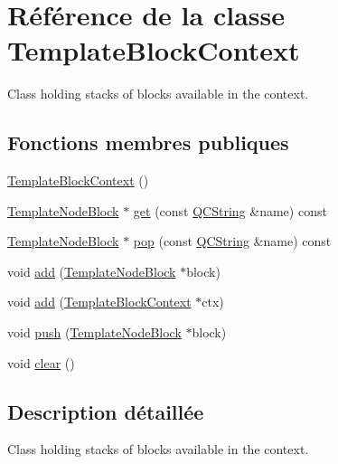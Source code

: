 \hypertarget{class_template_block_context}{}\section{Référence de la classe Template\+Block\+Context}
\label{class_template_block_context}


Class holding stacks of blocks available in the context.  


\subsection*{Fonctions membres publiques}
\begin{DoxyCompactItemize}
\item 
\hyperlink{class_template_block_context_a98a4ea674bc9af4bae99d619c01bd26d}{Template\+Block\+Context} ()
\item 
\hyperlink{class_template_node_block}{Template\+Node\+Block} $\ast$ \hyperlink{class_template_block_context_abebc72c582bed1f6d291bfc3bea93a7c}{get} (const \hyperlink{class_q_c_string}{Q\+C\+String} \&name) const 
\item 
\hyperlink{class_template_node_block}{Template\+Node\+Block} $\ast$ \hyperlink{class_template_block_context_ac053c83326fbbdff2843eb743b3bd81c}{pop} (const \hyperlink{class_q_c_string}{Q\+C\+String} \&name) const 
\item 
void \hyperlink{class_template_block_context_a3d0a08f3095d647312ccd6fce5b82f05}{add} (\hyperlink{class_template_node_block}{Template\+Node\+Block} $\ast$block)
\item 
void \hyperlink{class_template_block_context_a7f02a241cdd46776132a518d1b09649d}{add} (\hyperlink{class_template_block_context}{Template\+Block\+Context} $\ast$ctx)
\item 
void \hyperlink{class_template_block_context_a389d152f578bfdedac3175bcce274d60}{push} (\hyperlink{class_template_node_block}{Template\+Node\+Block} $\ast$block)
\item 
void \hyperlink{class_template_block_context_aa0e65aff7bd42fcdb019b4ad6ebdd170}{clear} ()
\end{DoxyCompactItemize}


\subsection{Description détaillée}
Class holding stacks of blocks available in the context. 

